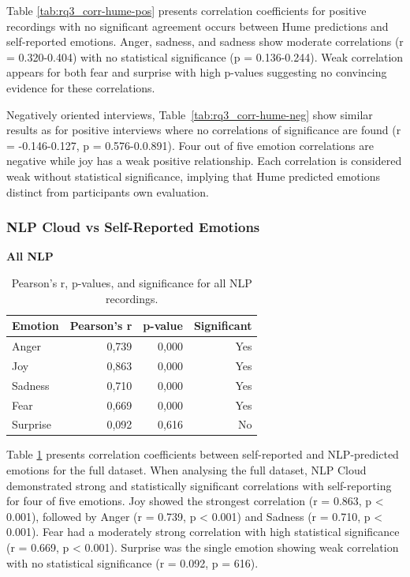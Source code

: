 Table \ref{tab:rq3_corr-hume-pos} presents correlation coefficients for positive recordings with no significant agreement occurs between Hume predictions and self-reported emotions. Anger, sadness, and sadness show moderate correlations (r = 0.320-0.404) with no statistical significance (p = 0.136-0.244). Weak correlation appears for both fear and surprise with high p-values suggesting no convincing evidence for these correlations. 

Negatively oriented interviews, Table~\ref{tab:rq3_corr-hume-neg} show similar results as for positive interviews where no correlations of significance are found (r = -0.146-0.127, p = 0.576-0.0.891). Four out of five emotion correlations are negative while joy has a weak positive relationship. Each correlation is considered weak without statistical significance, implying that Hume predicted emotions distinct from participants own evaluation.  
\subsubsection{NLP Cloud vs Self-Reported Emotions}
\label{sec:nlp-self}
\begin{table}[H]
    \centering
    \caption*{\textbf{All NLP}}
    \begin{tabular}{lrrr}
      \toprule
      \textbf{Emotion} & \textbf{Pearson’s r} & \textbf{p-value} & \textbf{Significant} \\
      \midrule
      Anger    & 0,739 & 0,000 & Yes \\
      Joy      & 0,863 & 0,000 & Yes \\
      Sadness  & 0,710 & 0,000 & Yes \\
      Fear     & 0,669 & 0,000 & Yes \\
      Surprise & 0,092 & 0,616 & No  \\
      \bottomrule
    \end{tabular}
    \caption{Pearson’s r, p-values, and significance for all NLP recordings.}
    \label{tab:rq3_corr-nlp-all}
  \end{table}

  Table \ref{tab:rq3_corr-nlp-all} presents correlation coefficients between self-reported and NLP-predicted emotions for the full dataset.
  When analysing the full dataset, NLP Cloud demonstrated strong and statistically significant correlations with self-reporting for four of five emotions. Joy showed the strongest correlation (r = 0.863, p < 0.001), followed by Anger (r = 0.739, p < 0.001) and Sadness (r = 0.710, p < 0.001). 
Fear had a moderately strong correlation with high statistical significance (r = 0.669, p < 0.001). Surprise was the single emotion showing weak correlation with no statistical significance (r = 0.092, p = 616). 
  
